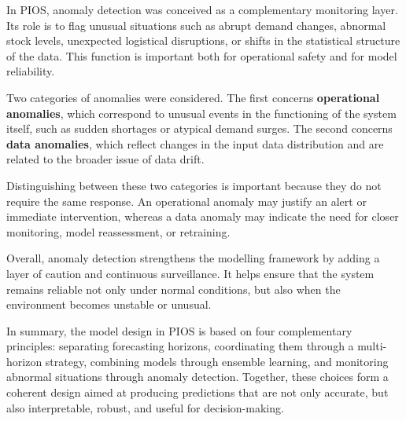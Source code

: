 In PIOS, anomaly detection was conceived as a complementary monitoring layer. Its role is to flag unusual situations such as abrupt demand changes, abnormal stock levels, unexpected logistical disruptions, or shifts in the statistical structure of the data. This function is important both for operational safety and for model reliability.

Two categories of anomalies were considered. The first concerns \textbf{operational anomalies}, which correspond to unusual events in the functioning of the system itself, such as sudden shortages or atypical demand surges. The second concerns \textbf{data anomalies}, which reflect changes in the input data distribution and are related to the broader issue of data drift.

Distinguishing between these two categories is important because they do not require the same response. An operational anomaly may justify an alert or immediate intervention, whereas a data anomaly may indicate the need for closer monitoring, model reassessment, or retraining.

Overall, anomaly detection strengthens the modelling framework by adding a layer of caution and continuous surveillance. It helps ensure that the system remains reliable not only under normal conditions, but also when the environment becomes unstable or unusual.

In summary, the model design in PIOS is based on four complementary principles: separating forecasting horizons, coordinating them through a multi-horizon strategy, combining models through ensemble learning, and monitoring abnormal situations through anomaly detection. Together, these choices form a coherent design aimed at producing predictions that are not only accurate, but also interpretable, robust, and useful for decision-making.
